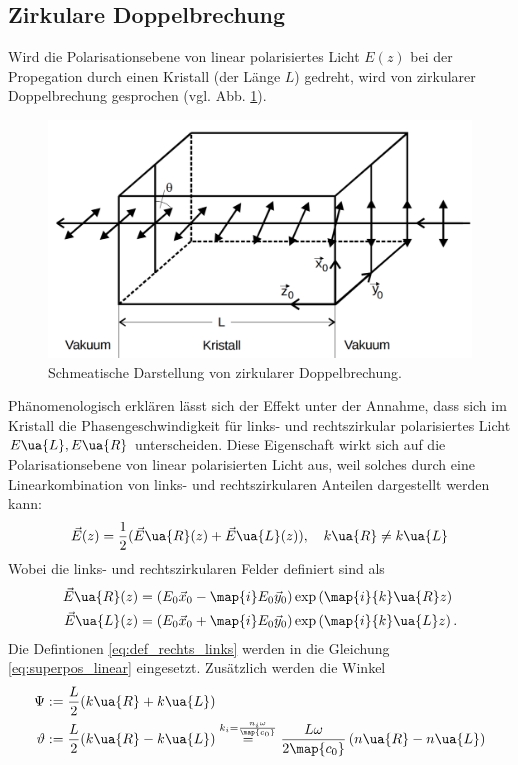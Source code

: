 \subsection{Zirkulare Doppelbrechung}
Wird die Polarisationsebene von linear polarisiertes Licht $E(z)$ bei der Propegation
durch einen Kristall (der Länge $L$) gedreht, wird von zirkularer Doppelbrechung gesprochen (vgl. Abb. \ref{fig:zirkulare_doppelbrechung}).
\begin{figure}
\centering
\includegraphics[width=0.5\linewidth]{./content/images/drehung_polarisationsebene.pdf}
\caption{Schmeatische Darstellung von zirkularer Doppelbrechung\cite{glan_thompson_prisma}.}
\label{fig:zirkulare_doppelbrechung}
\end{figure}
Phänomenologisch erklären lässt sich der Effekt unter der Annahme, dass sich im
Kristall die Phasengeschwindigkeit für links- und rechtszirkular polarisiertes
Licht $E\ua{L}, E\ua{R}$ unterscheiden. Diese Eigenschaft wirkt sich auf die Polarisationsebene
von linear polarisierten Licht aus, weil solches durch eine Linearkombination
von links- und rechtszirkularen Anteilen dargestellt werden kann:
\begin{equation}
  \label{eq:superpos_linear}
\vec{E}(z) = \frac{1}{2}( \vec{E}\ua{R}(z) + \vec{E}\ua{L}(z)), \quad k\ua{R}\neq k\ua{L}
\end{equation}
Wobei die links- und rechtszirkularen Felder definiert sind als
\begin{align}
  \label{eq:def_rechts_links}
  \begin{aligned}
  \vec{E}\ua{R}(z) &= \left(E_0 \vec{x}_0 - \map{i}E_0\vec{y}_0\right)\exp\left(\map{i}{k}\ua{R}z\right)\\
  \vec{E}\ua{L}(z) &= \left(E_0 \vec{x}_0 + \map{i}E_0\vec{y}_0\right)\exp\left(\map{i}{k}\ua{L}z\right).
\end{aligned}
\end{align}
Die Defintionen \eqref{eq:def_rechts_links} werden in die Gleichung \eqref{eq:superpos_linear}
eingesetzt. Zusätzlich werden die Winkel
\begin{align}
  \label{eq:winkel}
  \begin{aligned}
    \Psi&:=\frac{L}{2}(k\ua{R}+k\ua{L}) \\
    \vartheta &:= \frac{L}{2}(k\ua{R}-k\ua{L}) \overset{k_i=\frac{n_i\omega}{\map{c_0}}}{=} \frac{L\omega}{2\map{c_0}}\left(n\ua{R}-n\ua{L}\right)
\end{aligned}
\end{align}
